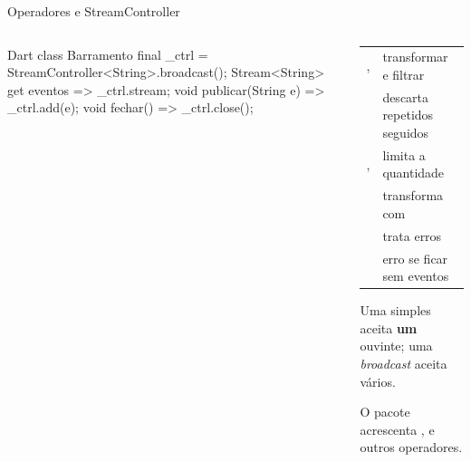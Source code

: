 \documentclass[aspectratio=169,10pt]{beamer}
\begin{document}
\begin{frame}[fragile]{Operadores e StreamController}
  \begin{columns}[T]
    \begin{column}{0.52\textwidth}
\begin{codigo}[title=StreamController]{Dart}
class Barramento {
  final _ctrl = StreamController<String>.broadcast();
  Stream<String> get eventos => _ctrl.stream;
  void publicar(String e) => _ctrl.add(e);
  void fechar() => _ctrl.close();
}
\end{codigo}
    \end{column}
    \begin{column}{0.46\textwidth}
      \scriptsize
      \begin{tabularx}{\linewidth}{@{}l L@{}}
        \toprule
         &  \\
        \midrule
        ,  & transformar e filtrar \\
         & descarta repetidos seguidos \\
        ,  & limita a quantidade \\
         & transforma com  \\
         & trata erros \\
         & erro se ficar sem eventos \\
        \bottomrule
      \end{tabularx}
      \begin{conceito}
        Uma  simples aceita \textbf{um} ouvinte; uma \emph{broadcast} aceita vários.
      \end{conceito}
      \begin{dica}
        O pacote  acrescenta ,  e outros operadores.
      \end{dica}
    \end{column}
  \end{columns}
\end{frame}
\end{document}
